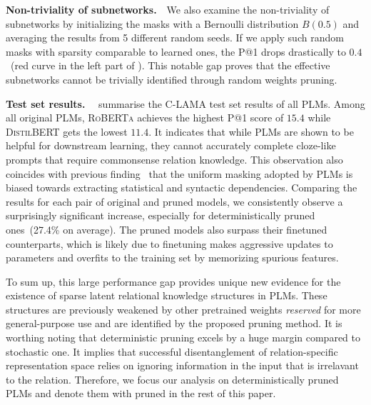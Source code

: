 \noindent
\textbf{Non-triviality of subnetworks.}~~We also examine the non-triviality of subnetworks by initializing the masks with a Bernoulli distribution $B(0.5)$ and averaging the results from 5 different random seeds.
If we apply such random masks with sparsity comparable to learned ones, the P@1 drops drastically to $0.4$~(red curve in the left part of ). This notable gap proves that the effective subnetworks cannot be trivially identified through random weights pruning.

\noindent
\textbf{Test set results.}~~ summarise the C-LAMA test set results of all PLMs. Among all original PLMs, \textsc{RoBERTa} achieves the highest P@1 score of $15.4$ while \textsc{DistilBERT} gets the lowest $11.4$. It indicates that while PLMs are shown to be helpful for downstream learning, they cannot accurately complete cloze-like prompts that require commonsense relation knowledge. This observation also coincides with previous finding~\citep{inductivemlm} that the uniform masking adopted by PLMs is biased towards extracting statistical and syntactic dependencies. 
Comparing the results for each pair of original and pruned models, we consistently observe a surprisingly significant increase, especially for deterministically pruned ones~(27.4\% on average). The pruned models also surpass their finetuned counterparts, which is likely due to finetuning makes aggressive updates to parameters and overfits to the training set by memorizing spurious features.

 To sum up, this large performance gap provides unique new evidence for the existence of sparse latent relational knowledge structures in PLMs. These structures are previously weakened by other pretrained weights \textit{reserved} for more general-purpose use and are identified by the proposed pruning method. It is worthing noting that  deterministic pruning excels by a huge margin compared to stochastic one. It implies that successful disentanglement of relation-specific representation space relies on ignoring information in the input  that is irrelavant to the relation.  Therefore,
we focus our analysis on deterministically 
pruned PLMs and denote them with  \textsf{pruned} in the rest of this paper. 

